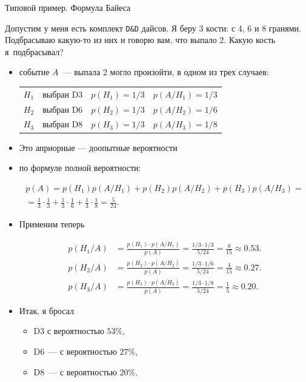 \documentclass[unicode,11pt,notheorems,xcolor=table]{beamer}
\begin{document}
 \begin{frame}[allowframebreaks]{Типовой пример. Формула Байеса}{}
    \begin{exampleblock}{}
        Допустим у меня есть комплект \texttt{D\&D} дайсов. Я беру 3 кости: с 4, 6 и 8 гранями. Подбрасываю какую-то из них и говорю вам, что выпало 2. Какую кость я~подбрасывал?
    \end{exampleblock}
    \framebreak
    \begin{itemize}
        \item {} событие $A$~--- выпала 2 могло произойти, в одном из трех случаев:
        \begin{tabular}{l@{\;---\;}l@{,\quad}l@{,\quad}l}
            $H_1$ & выбран D3 & $p(H_1)=1/3$ &$p(A/H_1)=1/3$\\
            $H_2$ & выбран D6 & $p(H_2)=1/3$ & $p(A/H_2)=1/6$\\
            $H_3$ & выбран D8 & $p(H_3)=1/3$ & $p(A/H_3)=1/8$\\
        \end{tabular}
        \item Это априорные --- доопытные вероятности
        \item {} по формуле полной вероятности:
        
        \begin{multline*}
            p(A)
            =p(H_1)p(A/H_1) + p(H_2)p(A/H_2) + p(H_3)p(A/H_3) 
            =\\
            =\frac{1}{3}\cdot \frac{1}{3} + \frac{1}{3}\cdot \frac{1}{6}+ \frac{1}{3}\cdot \frac{1}{8} = \frac{5}{24}.
        \end{multline*}
        \item Применим теперь 
        
        \begin{align*}
            p(H_1/A) &= \frac{p(H_1)\cdot p(A/H_1)}{p(A)} = \frac{1/3\cdot 1/3}{5/24} = \frac{8}{15} \approx 0.53.\\
            p(H_2/A) &= \frac{p(H_2)\cdot p(A/H_2)}{p(A)} = \frac{1/3\cdot 1/6}{5/24} = \frac{4}{15} \approx 0.27.\\
            p(H_3/A) &= \frac{p(H_3)\cdot p(A/H_3)}{p(A)} = \frac{1/3\cdot 1/8}{5/24} = \frac{1}{5} \approx 0.20.
        \end{align*}
            
        \item Итак, я бросал 
        \begin{itemize}
            \item D3 с вероятностью $53\%$,\\
            \item D6~--- с вероятностью $27\%$,
            \item D8~--- с вероятностью $20\%$.
        \end{itemize}
        

\end{itemize}
\end{frame}
\end{document}
